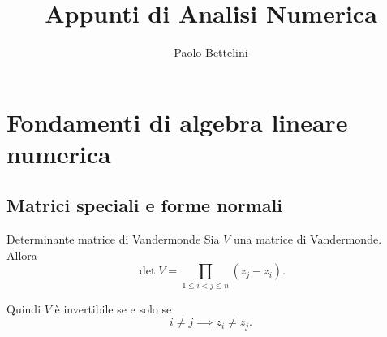 \documentclass[a4paper]{article}
\title{Appunti di Analisi Numerica}
\author{Paolo Bettelini}
\date{}
\begin{document}
\maketitle
\tableofcontents

\section{Fondamenti di algebra lineare numerica}

\subsection{Matrici speciali e forme normali}

\begin{snippettheorem}{Determinante matrice di Vandermonde}
    Sia \(V\) una matrice di Vandermonde. Allora
    \[
        \det V = \prod_{1 \leq i < j \leq n}(z_j - z_i).
    \]
\end{snippettheorem}

Quindi \(V\) è invertibile se e solo se
\[
    i \neq j \implies z_i \neq z_j.
\]
\end{document}
